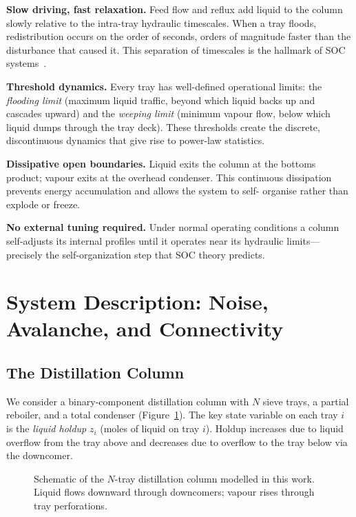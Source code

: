 \documentclass[twocolumn,12pt]{article}
\begin{document}
\textbf{Slow driving, fast relaxation.}  Feed flow and reflux add
liquid to the column slowly relative to the intra-tray hydraulic
timescales.  When a tray floods, redistribution occurs on the order of
seconds, orders of magnitude faster than the disturbance that caused it.
This separation of timescales is the hallmark of SOC systems~\cite{Bak1997}.

\textbf{Threshold dynamics.}  Every tray has well-defined operational
limits: the \textit{flooding limit} (maximum liquid traffic, beyond which
liquid backs up and cascades upward) and the \textit{weeping limit}
(minimum vapour flow, below which liquid dumps through the tray deck).
These thresholds create the discrete, discontinuous dynamics that give
rise to power-law statistics.

\textbf{Dissipative open boundaries.}  Liquid exits the column at the
bottoms product; vapour exits at the overhead condenser.  This continuous
dissipation prevents energy accumulation and allows the system to self-
organise rather than explode or freeze.

\textbf{No external tuning required.}  Under normal operating conditions
a column self-adjusts its internal profiles until it operates near its
hydraulic limits—precisely the self-organization step that SOC theory predicts.

\section{System Description: Noise, Avalanche, and Connectivity}

\subsection{The Distillation Column}

We consider a binary-component distillation column with $N$ sieve trays,
a partial reboiler, and a total condenser (Figure~\ref{fig:schematic}).
The key state variable on each tray $i$ is the \textit{liquid holdup}
$z_i$ (moles of liquid on tray $i$).  Holdup increases due to liquid
overflow from the tray above and decreases due to overflow to the tray
below via the downcomer.

\begin{figure}[H]
  \centering
  \caption{Schematic of the $N$-tray distillation column modelled in
           this work.  Liquid flows downward through downcomers;
           vapour rises through tray perforations.}
  \label{fig:schematic}
\end{figure}
\end{document}
